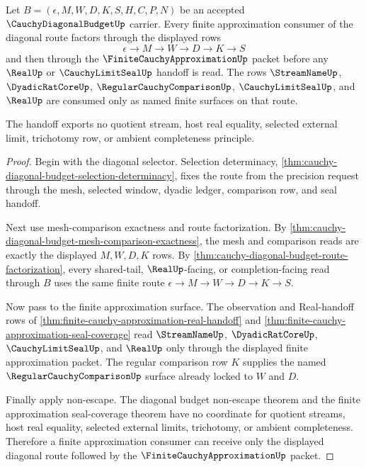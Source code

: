 \begin{theorem}
\label{thm:cauchy-diagonal-budget-finite-approximation-handoff}
Let $B=(\epsilon,M,W,D,K,S,H,C,P,N)$ be an accepted $\CauchyDiagonalBudgetUp$ carrier. Every finite approximation consumer of the diagonal route factors through the displayed rows
$$
\epsilon \to M \to W \to D \to K \to S
$$
and then through the $\FiniteCauchyApproximationUp$ packet before any $\RealUp$ or $\CauchyLimitSealUp$ handoff is read. The rows $\StreamNameUp$, $\DyadicRatCoreUp$, $\RegularCauchyComparisonUp$, $\CauchyLimitSealUp$, and $\RealUp$ are consumed only as named finite surfaces on that route.

The handoff exports no quotient stream, host real equality, selected external limit, trichotomy row, or ambient completeness principle.
\end{theorem}
\begin{proof}
Begin with the diagonal selector. Selection determinacy, \autoref{thm:cauchy-diagonal-budget-selection-determinacy}, fixes the route from the precision request through the mesh, selected window, dyadic ledger, comparison row, and seal handoff.

Next use mesh-comparison exactness and route factorization. By \autoref{thm:cauchy-diagonal-budget-mesh-comparison-exactness}, the mesh and comparison reads are exactly the displayed $M,W,D,K$ rows. By \autoref{thm:cauchy-diagonal-budget-route-factorization}, every shared-tail, $\RealUp$-facing, or completion-facing read through $B$ uses the same finite route $\epsilon \to M \to W \to D \to K \to S$.

Now pass to the finite approximation surface. The observation and Real-handoff rows of \autoref{thm:finite-cauchy-approximation-real-handoff} and \autoref{thm:finite-cauchy-approximation-seal-coverage} read $\StreamNameUp$, $\DyadicRatCoreUp$, $\CauchyLimitSealUp$, and $\RealUp$ only through the displayed finite approximation packet. The regular comparison row $K$ supplies the named $\RegularCauchyComparisonUp$ surface already locked to $W$ and $D$.

Finally apply non-escape. The diagonal budget non-escape theorem and the finite approximation seal-coverage theorem have no coordinate for quotient streams, host real equality, selected external limits, trichotomy, or ambient completeness. Therefore a finite approximation consumer can receive only the displayed diagonal route followed by the $\FiniteCauchyApproximationUp$ packet.
\end{proof}

